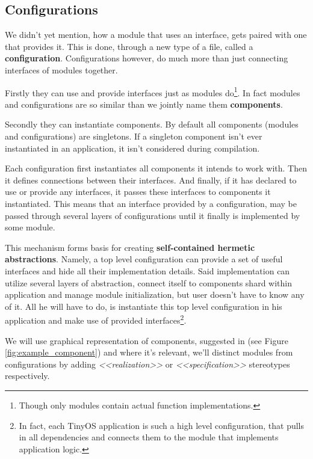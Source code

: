 \subsection{Configurations}

We didn't yet mention, how a module that uses an interface, gets
paired with one that provides it. This is done, through a new type of
a file, called a {\bf configuration}. Configurations however, do much
more than just connecting interfaces of modules together.

Firstly they can use and provide interfaces just as modules
do\footnote{Though only modules contain actual function
implementations.}. In fact modules and configurations are so similar
than we jointly name them {\bf components}.

Secondly they can instantiate components. By default all components
(modules and configurations) are singletons. If a singleton component
isn't ever instantiated in an application, it isn't considered during
compilation.

Each configuration first instantiates all components it intends to
work with. Then it defines connections between their interfaces. And
finally, if it has declared to use or provide any interfaces, it passes
these interfaces to components it instantiated.  This means that an
interface provided by a configuration, may be passed through several
layers of configurations until it finally is implemented by some
module.

This mechanism forms basis for creating {\bf self-contained hermetic
abstractions}. Namely, a top level configuration can provide a set of
useful interfaces and hide all their implementation details. Said
implementation can utilize several layers of abstraction, connect
itself to components shard within application and manage module
initialization, but user doesn't have to know any of it. All he will
have to do, is instantiate this top level configuration in his
application and make use of provided interfaces\footnote{In fact, each
TinyOS application is such a high level configuration, that pulls in
all dependencies and connects them to the module that implements
application logic.}.

We will use graphical representation of components, suggested in
\cite{UML2ForTOS} (see Figure \ref{fig:example_component}) and where
it's relevant, we'll distinct modules from configurations by adding
\emph{<<realization>>} or \emph{<<specification>>} stereotypes
respectively.

